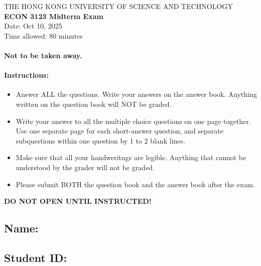 \documentclass[12pt]{article}
\begin{document}
\thispagestyle{empty}

\begin{center}
    THE HONG KONG UNIVERSITY OF SCIENCE AND TECHNOLOGY\\
    {\large \textbf{ECON 3123 Midterm Exam}}\\
    Date: Oct 10, 2025\\
    Time allowed: 80 minutes
\end{center}

\vspace{12pt}
\paragraph{Not to be taken away.}
\paragraph{Instructions:}
\begin{itemize}
    \item Answer ALL the questions. Write your answers on the answer book. Anything written on the question book will NOT be graded.
    \item Write your answer to all the multiple choice questions on one page together. Use one separate page for each short-answer question, and separate subquestions within one question by 1 to 2 blank lines. 
    \item Make sure that all your handweritngs are legible. Anything that cannot be understood by the grader will not be graded.
    \item Please submit BOTH the question book and the answer book after the exam.
\end{itemize}

\vspace{36pt}
\begin{center}
    \Large
    \textbf{DO NOT OPEN UNTIL INSTRUCTED!}
\end{center}

\vspace{36pt}
\subsection*{Name:}
\subsection*{Student ID: }

\clearpage
\setcounter{page}{1}
\end{document}
